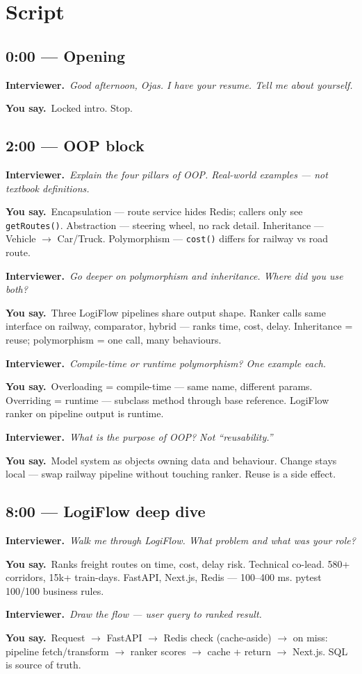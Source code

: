 \documentclass[11pt,a4paper]{article}
\newcommand{\IV}[1]{\par\vspace{4pt}\noindent\textcolor{qcol}{\textbf{Interviewer.}}~\textit{#1}\par}
\newcommand{\You}[1]{%
  \par\vspace{2pt}%
  \noindent\colorbox{youbg}{%
    \parbox{\dimexpr\textwidth-2\fboxsep}{\vspace{3pt}\textcolor{you}{\textbf{\small You say.}}~#1\vspace{3pt}}%
  }\par}
\begin{document}
\section{Script}

\subsection*{0:00 --- Opening}
\IV{Good afternoon, Ojas. I have your resume. Tell me about yourself.}
\You{Locked intro. Stop.}

\subsection*{2:00 --- OOP block}
\IV{Explain the four pillars of OOP. Real-world examples --- not textbook definitions.}
\You{Encapsulation --- route service hides Redis; callers only see \texttt{getRoutes()}. Abstraction --- steering wheel, no rack detail. Inheritance --- Vehicle $\rightarrow$ Car/Truck. Polymorphism --- \texttt{cost()} differs for railway vs road route.}

\IV{Go deeper on polymorphism and inheritance. Where did you use both?}
\You{Three LogiFlow pipelines share output shape. Ranker calls same interface on railway, comparator, hybrid --- ranks time, cost, delay. Inheritance = reuse; polymorphism = one call, many behaviours.}

\IV{Compile-time or runtime polymorphism? One example each.}
\You{Overloading = compile-time --- same name, different params. Overriding = runtime --- subclass method through base reference. LogiFlow ranker on pipeline output is runtime.}

\IV{What is the purpose of OOP? Not ``reusability.''}
\You{Model system as objects owning data and behaviour. Change stays local --- swap railway pipeline without touching ranker. Reuse is a side effect.}

\subsection*{8:00 --- LogiFlow deep dive}
\IV{Walk me through LogiFlow. What problem and what was your role?}
\You{Ranks freight routes on time, cost, delay risk. Technical co-lead. 580+ corridors, 15k+ train-days. FastAPI, Next.js, Redis --- 100--400 ms. pytest 100/100 business rules.}

\IV{Draw the flow --- user query to ranked result.}
\You{Request $\rightarrow$ FastAPI $\rightarrow$ Redis check (cache-aside) $\rightarrow$ on miss: pipeline fetch/transform $\rightarrow$ ranker scores $\rightarrow$ cache + return $\rightarrow$ Next.js. SQL is source of truth.}
\end{document}
